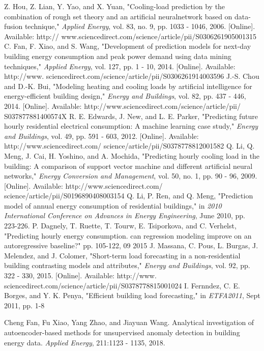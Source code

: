 \documentclass[conference]{IEEEtran}
\begin{document}
\begin{thebibliography}{00}
 Z. Hou, Z. Lian, Y. Yao, and X. Yuan, "Cooling-load prediction
by the combination of rough set theory and an artificial neuralnetwork based on data-fusion technique," \textit{Applied Energy},
vol. 83, no. 9, pp. 1033 - 1046, 2006. [Online]. Available: http://
	www.sciencedirect.com/science/article/pii/S0306261905001315
 C. Fan, F. Xiao, and S. Wang, "Development of prediction models for next-day building energy consumption and peak
power demand using data mining techniques," \textit{Applied Energy},
vol. 127, pp. 1 - 10, 2014. [Online]. Available: http://www.
	sciencedirect.com/science/article/pii/S0306261914003596
 J.-S. Chou and D.-K. Bui, "Modeling heating and cooling loads
by artificial intelligence for energy-efficient building design,"
\textit{Energy and Buildings}, vol. 82, pp. 437 - 446, 2014. [Online].
	Available: http://www.sciencedirect.com/science/article/pii/
	S037877881400574X
 R. E. Edwards, J. New, and L. E. Parker, "Predicting
future hourly residential electrical consumption: A machine
learning case study," \textit{Energy and Buildings}, vol. 49, pp. 591 -
	603, 2012. [Online]. Available: http://www.sciencedirect.com/
	science/article/pii/S0378778812001582
Q. Li, Q. Meng, J. Cai, H. Yoshino, and A. Mochida,
"Predicting hourly cooling load in the building: A comparison of
support vector machine and different artificial neural networks,"
\textit{Energy Conversion and Management}, vol. 50, no. 1, pp. 90
- 96, 2009. [Online]. Available: http://www.sciencedirect.com/
	science/article/pii/S0196890408003154
 Q. Li, P. Ren, and Q. Meng, "Prediction model of annual energy consumption of residential buildings," in \textit{2010 International
Conference on Advances in Energy Engineering}, June 2010, pp.
223-226.
P. Dagnely, T. Ruette, T. Tourw, E. Tsiporkova, and C. Verhelst,
"Predicting hourly energy consumption. can regression modeling
improve on an autoregressive baseline?" pp. 105-122, 09 2015
J. Massana, C. Pous, L. Burgas, J. Melendez, and J. Colomer,
"Short-term load forecasting in a non-residential building
contrasting models and attributes," \textit{Energy and Buildings},
vol. 92, pp. 322 - 330, 2015. [Online]. Available: http://www.
	sciencedirect.com/science/article/pii/S0378778815001024
 I. Fernndez, C. E. Borges, and Y. K. Penya, "Efficient building
load forecasting," in \textit{ETFA2011}, Sept 2011, pp. 1-8

Cheng Fan, Fu Xiao, Yang Zhao, and Jiayuan Wang. Analytical investigation of autoencoder-based methods for unsupervised anomaly detection in building energy data. \textit{Applied Energy},
211:1123 - 1135, 2018.


\end{thebibliography}
\end{document}
